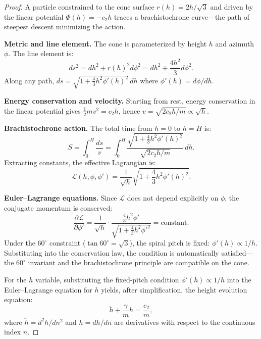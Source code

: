 \documentclass[12pt,a4paper]{article}
\begin{document}
\begin{proof}
A particle constrained to the cone surface $r(h) = 2h/\sqrt{3}$ and driven by the linear potential $\Phi(h) = -c_2 h$ traces a brachistochrone curve---the path of steepest descent minimizing the action.

\textbf{Metric and line element.} The cone is parameterized by height $h$ and azimuth $\phi$. The line element is:
\begin{equation}
ds^2 = dh^2 + r(h)^2 d\phi^2 = dh^2 + \frac{4h^2}{3} d\phi^2.
\end{equation}
Along any path, $ds = \sqrt{1 + \frac{4}{3}h^2 \phi'(h)^2}\, dh$ where $\phi'(h) = d\phi/dh$.

\textbf{Energy conservation and velocity.} Starting from rest, energy conservation in the linear potential gives $\frac{1}{2}mv^2 = c_2 h$, hence $v = \sqrt{2c_2 h/m} \propto \sqrt{h}$.

\textbf{Brachistochrone action.} The total time from $h=0$ to $h=H$ is:
\begin{equation}
S = \int_0^H \frac{ds}{v} = \int_0^H \frac{\sqrt{1 + \frac{4}{3}h^2 \phi'(h)^2}}{\sqrt{2c_2 h/m}}\, dh.
\end{equation}
Extracting constants, the effective Lagrangian is:
\begin{equation}
\mathcal{L}(h, \phi, \phi') = \frac{1}{\sqrt{h}} \sqrt{1 + \frac{4}{3}h^2 \phi'(h)^2}.
\end{equation}

\textbf{Euler--Lagrange equations.} Since $\mathcal{L}$ does not depend explicitly on $\phi$, the conjugate momentum is conserved:
\begin{equation}
\frac{\partial \mathcal{L}}{\partial \phi'} = \frac{1}{\sqrt{h}} \cdot \frac{\frac{4}{3}h^2 \phi'}{\sqrt{1 + \frac{4}{3}h^2 \phi'^2}} = \text{constant}.
\end{equation}
Under the $60^\circ$ constraint ($\tan 60^\circ = \sqrt{3}$), the spiral pitch is fixed: $\phi'(h) \propto 1/h$. Substituting into the conservation law, the condition is automatically satisfied---the $60^\circ$ invariant and the brachistochrone principle are compatible on the cone.

For the $h$ variable, substituting the fixed-pitch condition $\phi'(h) \propto 1/h$ into the Euler--Lagrange equation for $h$ yields, after simplification, the height evolution equation:
\begin{equation}
\ddot{h} + \frac{\gamma}{m}\dot{h} = \frac{c_2}{m},
\end{equation}
where $\ddot{h} = d^2h/dn^2$ and $\dot{h} = dh/dn$ are derivatives with respect to the continuous index $n$.


\end{proof}
\end{document}

